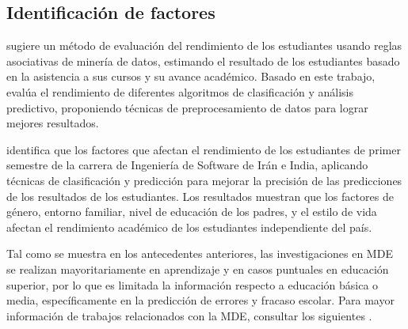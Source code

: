 \subsection*{Identificación de factores}
\textcite{borkar2013predicting} sugiere un método de evaluación del rendimiento de los estudiantes usando reglas asociativas de minería de datos, estimando el resultado de los estudiantes basado en la asistencia a sus cursos y su avance académico. Basado en este trabajo, \textcite{shazmeen2013performance} evalúa el rendimiento de diferentes algoritmos de clasificación y análisis predictivo, proponiendo técnicas de preprocesamiento de datos para lograr mejores resultados.

\textcite{oskouei2014predicting} identifica que los factores que afectan el rendimiento de los estudiantes de primer semestre de la carrera de Ingeniería de Software de Irán e India, aplicando técnicas de clasificación y predicción para mejorar la precisión de las predicciones de los resultados de los estudiantes. Los resultados muestran que los factores de género, entorno familiar, nivel de educación de los padres, y el estilo de vida afectan el rendimiento académico de los estudiantes independiente del país.

Tal como se muestra en los antecedentes anteriores, las investigaciones en MDE se realizan mayoritariamente en aprendizaje  y en casos puntuales en educación superior, por lo que es limitada la información respecto a educación básica o media, específicamente en la predicción de errores y fracaso escolar. Para mayor información de trabajos relacionados con la MDE, consultar los siguientes  \parencite{shahiri2015review,sukhija2015recent,anoopkumar2016review,dutt2017systematic}.